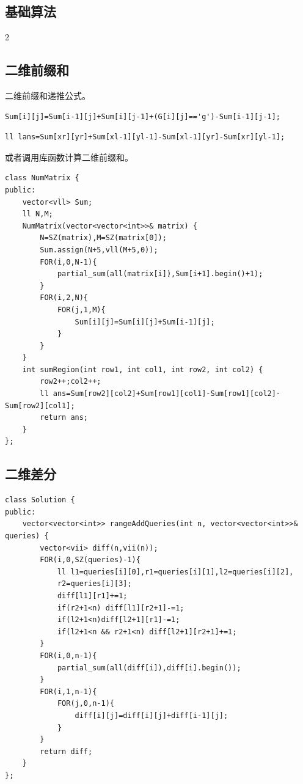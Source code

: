 	\begin{center}
		\section{基础算法}
	\end{center}

	\begin{multicols*}{2}

		\subsection{二维前缀和}

		二维前缀和递推公式。

		\begin{verbatim}
Sum[i][j]=Sum[i-1][j]+Sum[i][j-1]+(G[i][j]=='g')-Sum[i-1][j-1];
		\end{verbatim}

		\begin{verbatim}
ll lans=Sum[xr][yr]+Sum[xl-1][yl-1]-Sum[xl-1][yr]-Sum[xr][yl-1];
		\end{verbatim}

		或者调用库函数计算二维前缀和。

		\begin{verbatim}
class NumMatrix {
public:
    vector<vll> Sum;
    ll N,M;
    NumMatrix(vector<vector<int>>& matrix) {
        N=SZ(matrix),M=SZ(matrix[0]);
        Sum.assign(N+5,vll(M+5,0));
        FOR(i,0,N-1){
            partial_sum(all(matrix[i]),Sum[i+1].begin()+1);
        }
        FOR(i,2,N){
            FOR(j,1,M){
                Sum[i][j]=Sum[i][j]+Sum[i-1][j];
            }
        }
    }
    int sumRegion(int row1, int col1, int row2, int col2) {
        row2++;col2++;
        ll ans=Sum[row2][col2]+Sum[row1][col1]-Sum[row1][col2]-Sum[row2][col1];
        return ans;
    }
};
		\end{verbatim}

		\subsection{二维差分}

		\begin{verbatim}
class Solution {
public:
    vector<vector<int>> rangeAddQueries(int n, vector<vector<int>>& queries) {
        vector<vii> diff(n,vii(n));
        FOR(i,0,SZ(queries)-1){
            ll l1=queries[i][0],r1=queries[i][1],l2=queries[i][2],
            r2=queries[i][3];
            diff[l1][r1]+=1;
            if(r2+1<n) diff[l1][r2+1]-=1;
            if(l2+1<n)diff[l2+1][r1]-=1;
            if(l2+1<n && r2+1<n) diff[l2+1][r2+1]+=1;
        }
        FOR(i,0,n-1){
            partial_sum(all(diff[i]),diff[i].begin());
        }
        FOR(i,1,n-1){
            FOR(j,0,n-1){
                diff[i][j]=diff[i][j]+diff[i-1][j];
            }
        }
        return diff;
    }
};
		\end{verbatim}


\end{multicols*}
